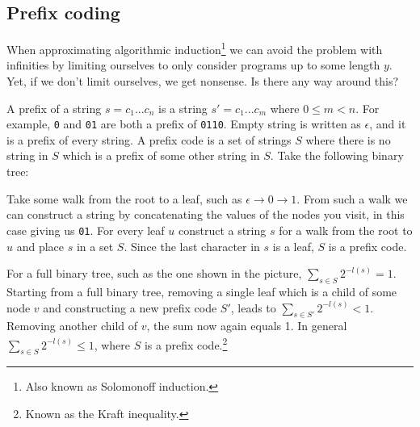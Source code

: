 \documentclass[oneside,hidelinks]{article}
\begin{document}
\newpage

\subsection{Prefix coding}

When approximating algorithmic induction\footnote{Also known as Solomonoff induction.} we can avoid the problem with infinities by limiting ourselves to only consider programs up to some length $y$.
Yet, if we don't limit ourselves, we get nonsense.
Is there any way around this?

A prefix of a string $s = c_1...c_n$ is a string $s' = c_1...c_m$ where $0 \leq m < n$.
For example, \texttt{0} and \texttt{01} are both a prefix of \texttt{0110}.
Empty string is written as $\epsilon$, and it is a prefix of every string.
A prefix code is a set of strings $S$ where there is no string in $S$ which is a prefix of some other string in $S$.
Take the following binary tree:

\begin{figure}[h]
	\centering
{}
\end{figure}

Take some walk from the root to a leaf, such as $\epsilon \rightarrow 0 \rightarrow 1$.
From such a walk we can construct a string by concatenating the values of the nodes you visit, in this case giving us \texttt{01}.
For every leaf $u$ construct a string $s$ for a walk from the root to $u$ and place $s$ in a set $S$.
Since the last character in $s$ is a leaf, $S$ is a prefix code.

For a full binary tree, such as the one shown in the picture, $\sum_{s \in S} 2^{-l(s)} = 1$.
Starting from a full binary tree, removing a single leaf which is a child of some node $v$ and constructing a new prefix code $S'$, leads to $\sum_{s \in S'} 2^{-l(s)} < 1$.
Removing another child of $v$, the sum now again equals 1.
In general $\sum_{s \in S} 2^{-l(s)} \leq 1$, where $S$ is a prefix code.\footnote{Known as the Kraft inequality.}
\end{document}
